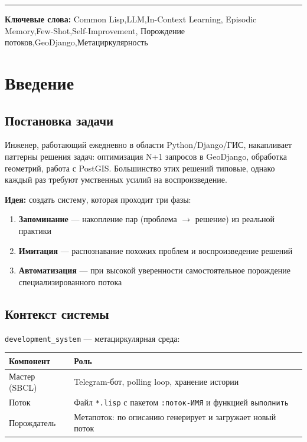 \documentclass[12pt, a4paper, twoside]{article}
\begin{document}
\begin{titlepage}
  \vfill

  {\color{AccentBlue}\rule{\textwidth}{0.4pt}}
  \vspace{4mm}
  {\small\color{MidGray}
    \textbf{Ключевые слова:}
    Common Lisp,\enspace LLM,\enspace In-Context Learning,\enspace
    Episodic Memory,\enspace Few-Shot,\enspace Self-Improvement,\enspace
    Порождение потоков,\enspace GeoDjango,\enspace Метациркулярность
  }

  \restoregeometry
\end{titlepage}

\tableofcontents
\newpage

\section{Введение}

\subsection{Постановка задачи}

Инженер, работающий ежедневно в области Python/Django/ГИС, накапливает
паттерны решения задач: оптимизация N+1 запросов в GeoDjango, обработка
геометрий, работа с PostGIS. Большинство этих решений типовые, однако
каждый раз требуют умственных усилий на воспроизведение.

\textbf{Идея:} создать систему, которая проходит три фазы:

\begin{enumerate}[leftmargin=1.5em]
  \item \textbf{Запоминание} --- накопление пар (проблема $\to$ решение) из реальной практики
  \item \textbf{Имитация} --- распознавание похожих проблем и воспроизведение решений
  \item \textbf{Автоматизация} --- при высокой уверенности самостоятельное порождение специализированного потока
\end{enumerate}

\subsection{Контекст системы}

\texttt{development\_system} --- метациркулярная среда:

\begin{center}
\begin{tabular}{ll}
  \toprule
  \textbf{Компонент} & \textbf{Роль} \\
  \midrule
  Мастер (SBCL) & Telegram-бот, polling loop, хранение истории \\
  Поток & Файл \texttt{*.lisp} с пакетом \texttt{:поток-ИМЯ} и функцией \texttt{выполнить} \\
  Порождатель & Метапоток: по описанию генерирует и загружает новый поток \\
  \bottomrule
\end{tabular}
\end{center}
\end{document}
